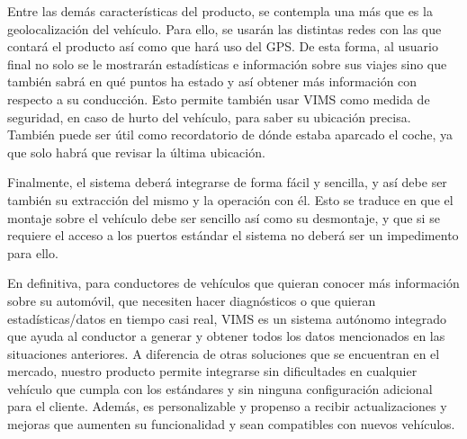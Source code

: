 Entre las demás características del producto, se contempla una más que es la
geolocalización del vehículo. Para ello, se usarán las distintas redes con
las que contará el producto así como que hará uso del \ac{GPS}. De esta forma,
al usuario final no solo se le mostrarán estadísticas e información sobre sus
viajes sino que también sabrá en qué puntos ha estado y así obtener más
información con respecto a su conducción. Esto permite también usar \ac{VIMS} como
medida de seguridad, en caso de hurto del vehículo, para saber su ubicación
precisa. También puede ser útil como recordatorio de dónde estaba aparcado el
coche, ya que solo habrá que revisar la última ubicación.

Finalmente, el sistema deberá integrarse de forma fácil y sencilla, y así debe ser
también su extracción del mismo y la operación con él. Esto se traduce en que el
montaje sobre el vehículo debe ser sencillo así como su desmontaje, y que si
se requiere el acceso a los puertos estándar el sistema no deberá ser un impedimento
para ello.

En definitiva, para conductores de vehículos que quieran conocer
más información sobre su automóvil, que necesiten hacer diagnósticos o que quieran
estadísticas/datos en tiempo casi real, \ac{VIMS} es un sistema autónomo integrado
que ayuda al conductor a generar y obtener todos los datos mencionados en las
situaciones anteriores. A diferencia de otras soluciones que se encuentran
en el mercado, nuestro producto permite integrarse sin dificultades en cualquier
vehículo que cumpla con los estándares y sin ninguna configuración adicional para
el cliente. Además, es personalizable y propenso a recibir actualizaciones
y mejoras que aumenten su funcionalidad y sean compatibles con nuevos vehículos.